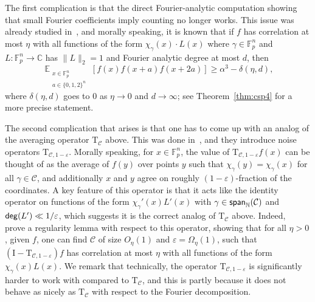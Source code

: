 \documentclass[10pt,a4paper]{amsart}
\newcommand\norm[1]{\| #1 \|}
\newcommand\Expect[2]{{\mathop{\mathbb{E}}_{#1}\left[ {#2} \right]}}
\newcommand\spn{{\sf span}_{\mathbb{N}}}
\newcommand\eps{\varepsilon}
\renewcommand\geq{\geqslant}
\begin{document}
The first complication is that the direct Fourier-analytic computation showing that small Fourier coefficients imply counting no longer works.
This issue was already studied in~\cite{BKM3AP,BKM4}, and morally speaking, it is known that if $f$ has correlation at most $\eta$ with all functions of the form $\chi_{\gamma}(x)\cdot L(x)$ 
where $\gamma\in\mathbb{F}_p^n$ and $L\colon \mathbb{F}_p^n\to\mathbb{C}$ has $\norm{L}_2=1$ and Fourier analytic degree at most $d$, then
\[
\Expect{\substack{x\in\mathbb{F}_p^n\\a\in\{0,1,2\}^n}}{f(x)f(x+a)f(x+2a)}
\geq \alpha^3 - \delta(\eta,d),
\]
where $\delta(\eta,d)$ goes to $0$ as $\eta\rightarrow 0$ and $d\rightarrow \infty$; see Theorem~\ref{thm:csp4} for a more precise statement. 


The second complication that arises is that one has to come up with an analog of the averaging operator $\mathrm{T}_{\mathcal{C}}$ above. This was done in~\cite{BKM5}, and they introduce noise operators $\mathrm{T}_{\mathcal{C},1-\eps}$. Morally speaking, for $x\in\mathbb{F}_p^n$, the value of $\mathrm{T}_{\mathcal{C},1-\eps}f(x)$ can be thought of as the average of $f(y)$ over points $y$ such that $\chi_{\gamma}(y) = \chi_{\gamma}(x)$ for all $\gamma\in\mathcal{C}$, and additionally $x$ and $y$ agree on roughly $(1-\eps)$-fraction of the coordinates. A key feature of this  operator is that it acts like the identity operator on functions of the form $\chi_{\gamma}'(x) L'(x)$ with $\gamma\in \spn(\mathcal{C})$ and ${\sf deg}(L')\ll 1/\eps$, which suggests it is the correct analog of $\mathrm{T}_{\mathcal{C}}$ above. Indeed,~\cite{BKM5} prove a regularity lemma with respect to this operator, showing that for all $\eta>0$, given $f$, one can find 
$\mathcal{C}$ of size $O_{\eta}(1)$ and $\eps = \Omega_{\eta}(1)$, such that 
$(\mathrm{I}-\mathrm{T}_{\mathcal{C},1-\eps})f$ has correlation at most $\eta$ with all functions of the form $\chi_{\gamma}(x) L(x)$. We remark that technically, the operator $\mathrm{T}_{\mathcal{C},1-\eps}$ is significantly harder to work with compared to $\mathrm{T}_{\mathcal{C}}$, and this is partly because it does not behave as nicely as $\mathrm{T}_{\mathcal{C}}$ with respect to the Fourier decomposition.
\end{document}
